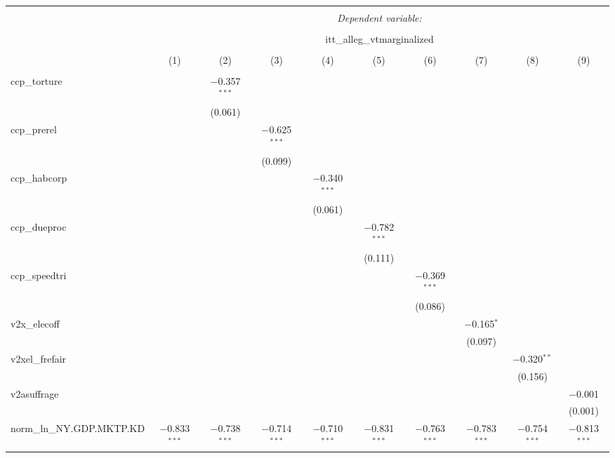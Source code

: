 
\begin{sidewaystable}[!htbp] \centering 
  \caption{} 
  \label{} 
\tiny 
\begin{tabular}{@{\extracolsep{5pt}}lccccccccc} 
\\[-1.8ex]\hline 
\hline \\[-1.8ex] 
 & \multicolumn{9}{c}{\textit{Dependent variable:}} \\ 
\cline{2-10} 
\\[-1.8ex] & \multicolumn{9}{c}{itt\_alleg\_vtmarginalized} \\ 
\\[-1.8ex] & (1) & (2) & (3) & (4) & (5) & (6) & (7) & (8) & (9)\\ 
\hline \\[-1.8ex] 
 ccp\_torture &  & $-$0.357$^{***}$ &  &  &  &  &  &  &  \\ 
  &  & (0.061) &  &  &  &  &  &  &  \\ 
  ccp\_prerel &  &  & $-$0.625$^{***}$ &  &  &  &  &  &  \\ 
  &  &  & (0.099) &  &  &  &  &  &  \\ 
  ccp\_habcorp &  &  &  & $-$0.340$^{***}$ &  &  &  &  &  \\ 
  &  &  &  & (0.061) &  &  &  &  &  \\ 
  ccp\_dueproc &  &  &  &  & $-$0.782$^{***}$ &  &  &  &  \\ 
  &  &  &  &  & (0.111) &  &  &  &  \\ 
  ccp\_speedtri &  &  &  &  &  & $-$0.369$^{***}$ &  &  &  \\ 
  &  &  &  &  &  & (0.086) &  &  &  \\ 
  v2x\_elecoff &  &  &  &  &  &  & $-$0.165$^{*}$ &  &  \\ 
  &  &  &  &  &  &  & (0.097) &  &  \\ 
  v2xel\_frefair &  &  &  &  &  &  &  & $-$0.320$^{**}$ &  \\ 
  &  &  &  &  &  &  &  & (0.156) &  \\ 
  v2asuffrage &  &  &  &  &  &  &  &  & $-$0.001 \\ 
  &  &  &  &  &  &  &  &  & (0.001) \\ 
  norm\_ln\_NY.GDP.MKTP.KD & $-$0.833$^{***}$ & $-$0.738$^{***}$ & $-$0.714$^{***}$ & $-$0.710$^{***}$ & $-$0.831$^{***}$ & $-$0.763$^{***}$ & $-$0.783$^{***}$ & $-$0.754$^{***}$ & $-$0.813$^{***}$ \\ 

\end{tabular}
\end{sidewaystable}
